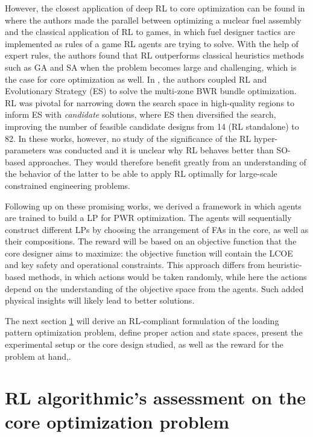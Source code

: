 \documentclass[a4paper]{article}
\begin{document}
However, the closest application of deep RL to core optimization can be found in \cite{radaideh2021physics} where the authors made the parallel between optimizing a nuclear fuel assembly and the classical application of RL to games, in which fuel designer tactics are implemented as rules of a game RL agents are trying to solve. With the help of expert rules, the authors found that RL outperforms classical heuristics methods such as GA and SA when the problem becomes large and challenging, which is the case for core optimization as well. In \cite{radaideh2021large}, the authors coupled RL and Evolutionary Strategy (ES) to solve the multi-zone BWR bundle optimization. RL was pivotal for narrowing down the search space in high-quality regions to inform ES with \textit{candidate} solutions, where ES then diversified the search, improving the number of feasible candidate designs from 14 (RL standalone) to 82. In these works, however, no study of the significance of the RL hyper-parameters was conducted and it is unclear why RL behaves better than SO-based approaches. They would therefore benefit greatly from an understanding of the behavior of the latter to be able to apply RL optimally for large-scale constrained engineering problems.

Following up on these promising works, we derived a framework in which agents are trained to build a LP for PWR optimization. The agents will sequentially construct different LPs by choosing the arrangement of FAs in the core, as well as their compositions. The reward will be based on an objective function that the core designer aims to maximize: the objective function will contain the LCOE and key safety and operational constraints. This approach differs from heuristic-based methods, in which actions would be taken randomly, while here the actions depend on the understanding of the objective space from the agents. Such added physical insights will likely lead to better solutions.

The next section \ref{sec:rlalgorithmicassessement} will derive an RL-compliant formulation of the loading pattern optimization problem, define proper action and state spaces, present the experimental setup or the core design studied, as well as the reward for the problem at hand,.
\section{RL algorithmic's assessment on the core optimization problem}
\label{sec:rlalgorithmicassessement}
\end{document}
